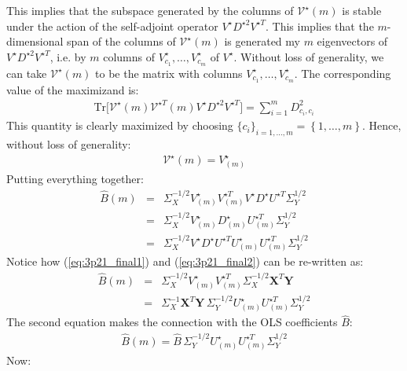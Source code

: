 This implies that the subspace generated by the columns of $\mathcal{V} ^{\star}(m)$ is stable under the action of the self-adjoint operator $V ^{\star}D ^{\star 2} V ^{\star T}$. This implies that the $m$-dimensional span of the columns of $\mathcal{V} ^{\star}(m)$ is generated my $m$ eigenvectors of $V ^{\star}D ^{\star 2} V ^{\star T}$, i.e. by $m$ columns of $V ^{\star}_{c_1}, \ldots, V ^{\star}_{c_m}$ of $V ^{\star}$. Without loss of generality, we can take $\mathcal{V} ^{\star}(m)$ to be the matrix with columns $V ^{\star}_{c_1}, \ldots, V ^{\star}_{c_m}$. The corresponding value of the maximizand is:
\begin{eqnarray*}
    \textrm{Tr} \Big[ \mathcal{V}^{\star}(m) \mathcal{V} ^{\star T}(m) V ^{\star} D ^{\star 2} V ^{\star T} \Big] = \sum_{i = 1}^{m} D_{c_i, c_i}^2
\end{eqnarray*}
This quantity is clearly maximized by choosing $\{c_i\}_{i=1, \ldots, m} = \left\{ 1, \ldots, m \right\}$. Hence, without loss of generality:
\begin{eqnarray}
\mathcal{V} ^{\star}(m) = V ^{\star}_{(m)}
\end{eqnarray}
Putting everything together:
\begin{eqnarray} \label{eq:3p21_final1}
\hat{B}(m) & = & \Sigma_X ^{-1/2} V ^{\star}_{(m)} V ^{\star T}_{(m)} V ^{\star} D ^{\star} U ^{\star T} \Sigma_Y^{1/2} \\
& = & \Sigma_X ^{-1/2} V ^{\star}_{(m)} D ^{\star}_{(m)} U ^{\star T}_{(m)} \Sigma_Y^{1/2}\\
\label{eq:3p21_final2}
& = & \Sigma_X ^{-1/2} V ^{\star} D ^{\star} U ^{\star T} U ^{\star}_{(m)}U ^{\star T}_{(m)}  \Sigma_Y^{1/2}
\end{eqnarray}
Notice how (\ref{eq:3p21_final1}) and (\ref{eq:3p21_final2}) can be re-written as:
\begin{eqnarray} \label{eq:3p21_final}
\hat{B}(m) & = & \Sigma_X ^{-1/2} V ^{\star}_{(m)} V ^{\star T}_{(m)} \Sigma_X^{-1/2} \mathbf{X}^T \mathbf{Y}\\
& = & \Sigma_X^{-1}\mathbf{X}^T \mathbf{Y}\,\Sigma_Y^{-1/2} U ^{\star}_{(m)}U ^{\star T}_{(m)}  \Sigma_Y^{1/2}
\end{eqnarray}
The second equation makes the connection with the OLS coefficients $\hat{B}$:
\begin{eqnarray} \label{eq:3p21_e4}
\hat{B}(m) = \hat{B}\, \Sigma_Y^{-1/2} U ^{\star}_{(m)}U ^{\star T}_{(m)}  \Sigma_Y^{1/2}
\end{eqnarray}
Now:
